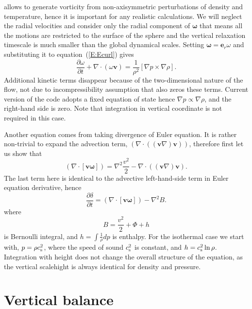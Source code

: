 \documentclass[usenatbib,onecolumn]{mnras}
\renewcommand{\vector}[1]{\ensuremath{\mathbf{#1}}}
\newcommand{\pardir}[2]{\ensuremath{\frac{\partial #2}{\partial #1} }}
\begin{document}
allows to generate vorticity from non-axisymmetric perturbations of density
and temperature, hence it is important for any realistic calculations. We will
neglect the radial velocities and consider only the radial component of
$\vector{\omega}$ that means all the motions are restricted to the surface of
the sphere and the vertical relaxation timescale is much smaller than the
global dynamical scales. Setting $\vector{\omega} = \vector{e}_r \omega$ and
substituting it to equation~(\ref{E:Ecurl}) gives
\begin{equation}\label{E:Ecurl:r}
\displaystyle  \pardir{t}{\omega} + \nabla \cdot (\omega \vector{v}) =
\frac{1}{\rho^2}\left[\nabla p \times \nabla \rho \right].
\end{equation}
Additional kinetic terms disappear because of the two-dimensional nature of
the flow, not due to incompressibility assumption that also zeros these
terms. Current version of the code adopts a fixed equation of state hence
$\nabla p \propto \nabla \rho $, and the right-hand side is zero. Note that
integration in vertical coordinate is not required in this case. 

Another equation comes from taking divergence of Euler equation. It is rather
non-trivial to expand the advection term, $(\nabla \cdot
((\vector{v}\nabla)\vector{v}))$, therefore first let us show that
\begin{equation}\label{E:vomega}
\left(\nabla \cdot \left[ \vector{v} \vector{\omega}\right] \right) = 
 \nabla^2\frac{v^2}{2} - \nabla \cdot \left((\vector{v}\nabla)\vector{v}\right).
\end{equation}
The last term here is identical to the advective left-hand-side term in Euler
equation derivative, hence
\begin{equation}\label{E:delta}
\pardir{t}{\delta} = \left(\nabla \cdot \left[ \vector{v}
  \vector{\omega}\right] \right) -  \nabla^2 B.
\end{equation}
where
\begin{equation}\label{E:Bernoulli}
B = \frac{v^2}{2} + \Phi + h
\end{equation}
is Bernoulli integral, and $h = \int \frac{1}{\rho}dp$ is enthalpy. For the
isothermal case we start with, $p =  \rho c_{\rm s}^2$, where the speed of
sound $c_{\rm s}^2$ is constant, and $h= c_{\rm s}^2 \ln\rho$. Integration
with height does not change the overall structure of the equation, as the
vertical scalehight is always identical for density and pressure. 

\section{Vertical balance}






\label{lastpage}
\end{document}

